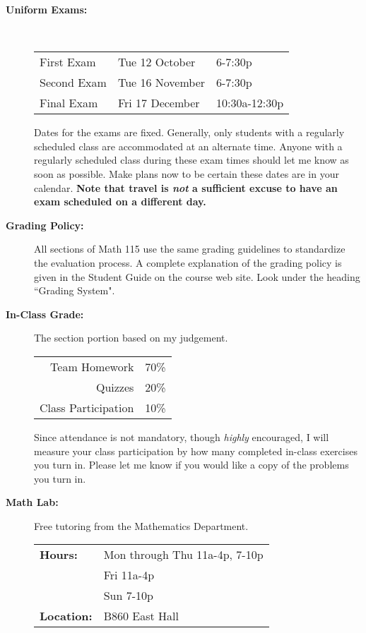 \documentclass[11pt,twoside]{article}
\begin{document}
\begin{description}
\vspace{.1in}
\item[\bf Uniform Exams:]\mbox{\ }

\begin{tabular}{lll}
First Exam &  Tue 12 October & 6-7:30p \\
Second Exam & Tue 16 November & 6-7:30p \\
Final Exam &  Fri 17 December & 10:30a-12:30p
\end{tabular}

Dates for the exams are fixed.  Generally, only students with a regularly scheduled
class are accommodated at an alternate time. Anyone with a
regularly scheduled class during these exam times should let me
know as soon as possible. Make plans now to be certain these dates are in your calendar.  \textbf{Note that travel is \emph{not} a sufficient excuse to have an exam scheduled on a different day.}

\vspace{.1in}
\item[\bf Grading Policy:]  All sections of Math 115 use the same grading guidelines to standardize the evaluation process.  A complete explanation of the grading policy is given in the Student Guide on the course web site.  Look under the heading ``Grading System".  

\vspace{.1in}
\item[\bf In-Class Grade:]  The section portion based on my judgement.

\begin{tabular}{rl}
 Team Homework & 70\% \\
 Quizzes & 20\% \\
 Class Participation & 10\%
\end{tabular}

Since attendance is not mandatory, though \emph{highly} encouraged, I will measure your class participation by how many completed in-class exercises you turn in.  Please let me know if you would like a copy of the problems you turn in.

\vspace{.1in}
\item[\bf Math Lab:]  Free tutoring from the Mathematics
Department.

\begin{tabular}{ll}
{\bf Hours:} & Mon through Thu 11a-4p, 7-10p \\
             & Fri 11a-4p \\
             & Sun 7-10p \\
{\bf Location:} & B860 East Hall
\end{tabular}


\end{description}
\end{document}
